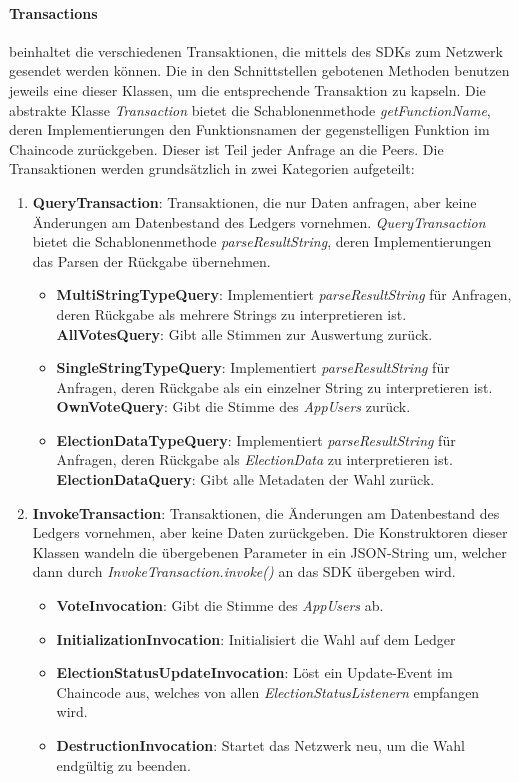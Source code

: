 \documentclass[parskip=full]{scrartcl}
\newcommand{\textitx}[1]{\mbox{\textit{#1}}}
\newcommand{\fakeparagraph}[1]{\textbf{#1}}
\begin{document}
	\paragraph{Transactions} beinhaltet die verschiedenen Transaktionen, die mittels des SDKs zum Netzwerk gesendet werden können. Die in den Schnittstellen gebotenen Methoden benutzen jeweils eine dieser Klassen, um die entsprechende Transaktion zu kapseln. Die abstrakte Klasse \textit{Transaction} bietet die Schablonenmethode \textit{getFunctionName}, deren Implementierungen den Funktionsnamen der gegenstelligen Funktion im Chaincode zurückgeben. Dieser ist Teil jeder Anfrage an die Peers. Die Transaktionen werden grundsätzlich in zwei Kategorien aufgeteilt:
	\begin{enumerate}
			\item\fakeparagraph{QueryTransaction}: Transaktionen, die nur Daten anfragen, aber keine Änderungen am Datenbestand des Ledgers vornehmen. \textit{QueryTransaction} bietet die Schablonenmethode \textit{parseResultString}, deren Implementierungen das Parsen der Rückgabe übernehmen.
			\begin{itemize}
				\item \fakeparagraph{MultiStringTypeQuery}: Implementiert \textit{parseResultString} für Anfragen, deren Rückgabe als mehrere Strings zu interpretieren ist.
				\subitem \fakeparagraph{AllVotesQuery}: Gibt alle Stimmen zur Auswertung zurück.
				\item \fakeparagraph{SingleStringTypeQuery}: Implementiert \textit{parseResultString} für Anfragen, deren Rückgabe als ein einzelner String zu interpretieren ist.
				\subitem \fakeparagraph{OwnVoteQuery}: Gibt die Stimme des \textitx{AppUsers} zurück.
				\item \fakeparagraph{ElectionDataTypeQuery}: Implementiert \textit{parseResultString} für Anfragen, deren Rückgabe als \textit{ElectionData} zu interpretieren ist.
				\subitem \fakeparagraph{ElectionDataQuery}: Gibt alle Metadaten der Wahl zurück.
			\end{itemize}
			\item \fakeparagraph{InvokeTransaction}: Transaktionen, die Änderungen am Datenbestand des Ledgers vornehmen, aber keine Daten zurückgeben. Die Konstruktoren dieser Klassen wandeln die übergebenen Parameter in ein JSON-String um, welcher dann durch \textitx{InvokeTransaction.invoke()} an das SDK übergeben wird.
			\begin{itemize}
				\item \fakeparagraph{VoteInvocation}: Gibt die Stimme des \textitx{AppUsers} ab.
				\item \fakeparagraph{InitializationInvocation}: Initialisiert die Wahl auf dem Ledger
				\item \fakeparagraph{ElectionStatusUpdateInvocation}: Löst ein Update-Event im Chaincode aus, welches von allen \textitx{ElectionStatusListenern} empfangen wird.
				\item \fakeparagraph{DestructionInvocation}: Startet das Netzwerk neu, um die Wahl endgültig zu beenden.
			\end{itemize}
	\end{enumerate}
\end{document}
